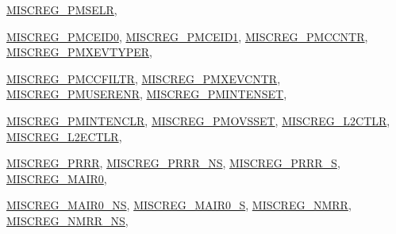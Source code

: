 \begin{DoxyCompactItemize}
\hyperlink{namespaceArmISA_a1e522017e015d4c7efd6b2360143aa67a69dd272ff1035d91d1a3f7171f065967}{MISCREG\_\-PMSELR}, 
\par
\hyperlink{namespaceArmISA_a1e522017e015d4c7efd6b2360143aa67a422c07b0a04159d4d48e94f60ff74fcd}{MISCREG\_\-PMCEID0}, 
\hyperlink{namespaceArmISA_a1e522017e015d4c7efd6b2360143aa67a149ccd9afbc00f88dbf3726b494441e7}{MISCREG\_\-PMCEID1}, 
\hyperlink{namespaceArmISA_a1e522017e015d4c7efd6b2360143aa67a8757e68e8b7b3c9ac216ad6b136a1cd2}{MISCREG\_\-PMCCNTR}, 
\hyperlink{namespaceArmISA_a1e522017e015d4c7efd6b2360143aa67a4ad9a50f810ebdedb398b65f8077c00b}{MISCREG\_\-PMXEVTYPER}, 
\par
\hyperlink{namespaceArmISA_a1e522017e015d4c7efd6b2360143aa67ae95a361db9bef77ab874c277be6f8436}{MISCREG\_\-PMCCFILTR}, 
\hyperlink{namespaceArmISA_a1e522017e015d4c7efd6b2360143aa67ad92296de036abc7367c16eef6bbf2f65}{MISCREG\_\-PMXEVCNTR}, 
\hyperlink{namespaceArmISA_a1e522017e015d4c7efd6b2360143aa67a8c542de4c994fef8ca5ec1b149db90da}{MISCREG\_\-PMUSERENR}, 
\hyperlink{namespaceArmISA_a1e522017e015d4c7efd6b2360143aa67a4880acfbf4ed4afcac35a22e2687f4bb}{MISCREG\_\-PMINTENSET}, 
\par
\hyperlink{namespaceArmISA_a1e522017e015d4c7efd6b2360143aa67acb1abc1baf5ee833038e23eaa6e51c29}{MISCREG\_\-PMINTENCLR}, 
\hyperlink{namespaceArmISA_a1e522017e015d4c7efd6b2360143aa67ab6708bf2c53f0c600c87a79f72e23140}{MISCREG\_\-PMOVSSET}, 
\hyperlink{namespaceArmISA_a1e522017e015d4c7efd6b2360143aa67a97759fcf44183a539b0b5ce828428409}{MISCREG\_\-L2CTLR}, 
\hyperlink{namespaceArmISA_a1e522017e015d4c7efd6b2360143aa67ab2cb68aee7e771376c32404b24c331dd}{MISCREG\_\-L2ECTLR}, 
\par
\hyperlink{namespaceArmISA_a1e522017e015d4c7efd6b2360143aa67a2dd4330c32e639766e4084a25bed61fd}{MISCREG\_\-PRRR}, 
\hyperlink{namespaceArmISA_a1e522017e015d4c7efd6b2360143aa67a9991506a7015317a36779c79157aad14}{MISCREG\_\-PRRR\_\-NS}, 
\hyperlink{namespaceArmISA_a1e522017e015d4c7efd6b2360143aa67a9ccf15a314ab6133ae6b7177d478d1bc}{MISCREG\_\-PRRR\_\-S}, 
\hyperlink{namespaceArmISA_a1e522017e015d4c7efd6b2360143aa67a56e98434ad8972b7ea266287f37cb6c6}{MISCREG\_\-MAIR0}, 
\par
\hyperlink{namespaceArmISA_a1e522017e015d4c7efd6b2360143aa67aa81ec0367d3e78e12996e85341da3fbf}{MISCREG\_\-MAIR0\_\-NS}, 
\hyperlink{namespaceArmISA_a1e522017e015d4c7efd6b2360143aa67a73cfd7f2d06b4d86a37ca8236faa0d04}{MISCREG\_\-MAIR0\_\-S}, 
\hyperlink{namespaceArmISA_a1e522017e015d4c7efd6b2360143aa67a6fb4be4fd646a683f615c3bb4925fc01}{MISCREG\_\-NMRR}, 
\hyperlink{namespaceArmISA_a1e522017e015d4c7efd6b2360143aa67a395d842cdc539597f76abf72501c1813}{MISCREG\_\-NMRR\_\-NS}, 

\end{DoxyCompactItemize}
